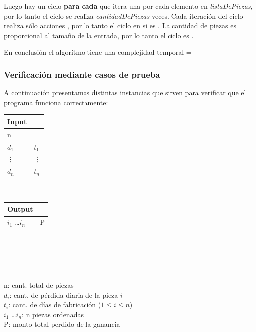 \documentclass[11pt, a4paper, twoside]{article}
\begin{document}
  Luego hay un ciclo \textbf{para cada} que itera una por cada elemento en \textit{listaDePiezas},
por lo tanto el ciclo se realiza \textit{cantidadDePiezas} veces. Cada iteración del ciclo realiza
sólo acciones , por lo tanto el ciclo en si es . La cantidad de piezas
es proporcional al tamaño de la entrada, por lo tanto el ciclo es .

  En conclusión el algorítmo tiene una complejidad temporal =

  




\subsubsection{Verificación mediante casos de prueba}

A continuación presentamos distintas instancias que sirven para verificar que el programa funciona correctamente: \\ 

\begin{minipage}{0.2\textwidth}
	\begin{tabular}{ll}
		Input  \\
		\hline
		n &  \\
		$d_1$ & $t_1$ \\
		\vdots & \vdots \\
		$d_n$ & $t_n$ 
	\end{tabular} \\ 
\end{minipage}
\begin{minipage}{0.2\textwidth}
	\begin{tabular}{ll}
		Output  \\
		\hline
		$i_1$ \dots $i_n$ & P \\
		 \\
		 \\
		 \\
	\end{tabular} \\ 
\end{minipage}  \\
\\
n: cant. total de piezas  \\
$d_i$: cant. de pérdida diaria de la pieza $i$ \\
$t_i$: cant. de días de fabricación ($1 \le i \le n$) \\
$i_1$ \dots $i_n$: n piezas ordenadas \\
P: monto total perdido de la ganancia \\
\end{document}
